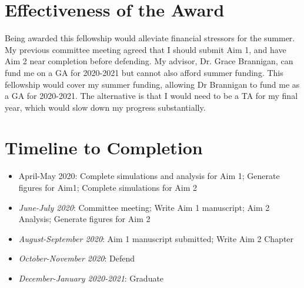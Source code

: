 \documentclass[9pt]{extarticle} %
\begin{document}
\section*{Effectiveness of the Award}
Being awarded this fellowship would alleviate financial stressors for the summer. My previous committee meeting agreed that I should submit Aim 1, and have Aim 2 near completion before defending. My advisor, Dr. Grace Brannigan, can fund me on a GA for 2020-2021 but cannot also afford summer funding.  This fellowship would cover my summer funding, allowing Dr Brannigan to fund me as a GA for 2020-2021. The alternative is that I would need to be a TA for my final year, which would slow down my progress substantially. 

\section*{Timeline to Completion}

\begin{itemize}
	\item April-May 2020: Complete simulations and analysis for Aim 1; Generate figures for Aim1; Complete simulations for Aim 2
	\item  \textit{June-July 2020}: Committee meeting; Write Aim 1 manuscript; Aim 2 Analysis; Generate figures for Aim 2
	\item  \textit{August-September 2020}: Aim 1 manuscript submitted; Write Aim 2 Chapter
	\item  \textit{October-November 2020}: Defend
	\item \textit{December-January 2020-2021}: Graduate
\end{itemize}
\end{document}
